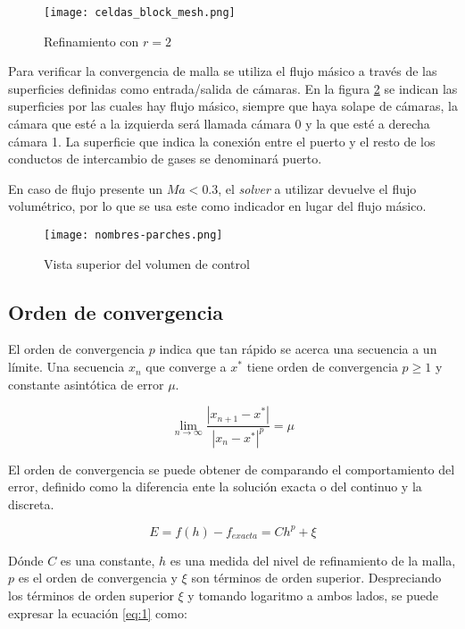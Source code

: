 \begin{figure}[h]
    \centering
    \texttt{[image: celdas\_block\_mesh.png]}
    \caption{Refinamiento con $r=2$}
    \label{fig:celdas_bm}
\end{figure}

Para verificar la convergencia de malla se utiliza el flujo másico a través
de las superficies definidas como entrada/salida de cámaras.
%
En la figura \ref{fig:parches} se indican las superficies por las cuales hay
flujo másico, siempre que haya solape de cámaras, la cámara que esté a la
izquierda será llamada cámara 0 y la que esté a derecha cámara 1.
%
La superficie que indica la conexión entre el puerto y el resto de los conductos
de intercambio de gases se denominará puerto.


En caso de flujo presente un $Ma < 0.3$, el \emph{solver} a utilizar devuelve
el flujo volumétrico, por lo que se usa este como indicador en lugar del flujo
másico.

\begin{figure}[ht]
    \centering
    \texttt{[image: nombres-parches.png]}
    \caption{Vista superior del volumen de control}
    \label{fig:parches}
\end{figure}

\subsection{Orden de convergencia}
%
El orden de convergencia $p$ indica que tan rápido se acerca una secuencia a un
límite.
%
Una secuencia ${x_n}$ que converge a $x^*$ tiene orden de convergencia $p \ge
1$ y constante asintótica de error $\mu$.

\begin{equation}
    \lim_{n\rightarrow \infty} \frac{|x_{n+1} - x^*|} {|x_{n} - x^*|^p} = \mu
\end{equation}

El orden de convergencia se puede obtener de comparando el comportamiento del
error, definido como la diferencia ente la solución exacta o del continuo y la
discreta.

\begin{equation}
    E = f(h) - f_{exacta} = Ch^p + \xi
    \label{eq:1}
\end{equation}

Dónde $C$ es una constante, $h$ es una medida del nivel de refinamiento de la
malla, $p$ es el orden de convergencia y $\xi$ son términos de orden superior.
%
Despreciando los términos de orden superior $\xi$ y tomando logaritmo a ambos
lados, se puede expresar la ecuación \ref{eq:1} como:

